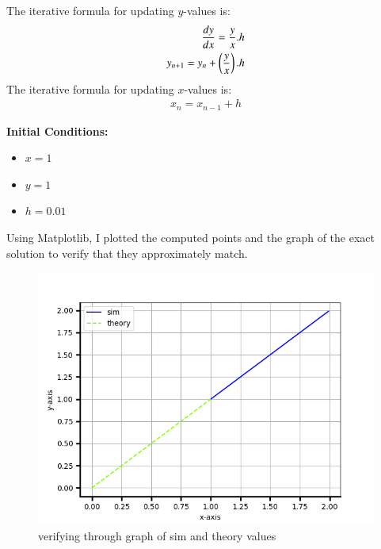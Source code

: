 \documentclass[article]{IEEEtran}
\numberwithin{figure}{enumi}
\begin{document}
\noindent The iterative formula for updating $y$-values is:  
\begin{align}
    \frac{dy}{dx}=\frac{y}{x}.h\\
    y_{n+1}=y_n+\left(\frac{y}{x}\right).h
\end{align}
The iterative formula for updating $x$-values is: 
\begin{align}
    x_n=x_{n-1}+h
\end{align} 

\noindent\textbf{Initial Conditions:}  
\begin{itemize}
    \item $x = 1$  
    \item $y = 1$  
    \item $h = 0.01$  
\end{itemize}

Using Matplotlib, I plotted the computed points and the graph of the exact solution to verify that they approximately match.
\begin{figure}[h!]
	\centering
	\includegraphics[width=\columnwidth]{figs/problem2.png}
	\caption{verifying through graph of sim and theory values}
	\label{stemplot}
\end{figure}	
\end{document}
